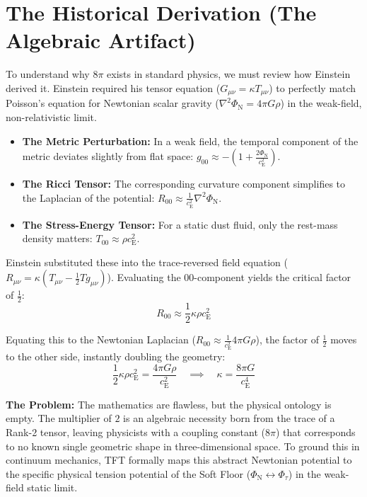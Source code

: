 \section{The Historical Derivation (The Algebraic Artifact)}
To understand why $8\pi$ exists in standard physics, we must review how Einstein derived it. Einstein required his tensor equation ($G_{\mu\nu} = \kappa T_{\mu\nu}$) to perfectly match Poisson's equation for Newtonian scalar gravity ($\nabla^2 \Phi_{\mathrm{N}} = 4\pi G \rho$) in the weak-field, non-relativistic limit.

\begin{itemize}
    \item \textbf{The Metric Perturbation:} In a weak field, the temporal component of the metric deviates slightly from flat space: $g_{00} \approx -\left(1 + \frac{2\Phi_{\mathrm{N}}}{c_{\mathrm{E}}^2}\right)$.
    \item \textbf{The Ricci Tensor:} The corresponding curvature component simplifies to the Laplacian of the potential: $R_{00} \approx \frac{1}{c_{\mathrm{E}}^2} \nabla^2 \Phi_{\mathrm{N}}$.
    \item \textbf{The Stress-Energy Tensor:} For a static dust fluid, only the rest-mass density matters: $T_{00} \approx \rho c_{\mathrm{E}}^2$.
\end{itemize}

Einstein substituted these into the trace-reversed field equation ($R_{\mu\nu} = \kappa \left(T_{\mu\nu} - \frac{1}{2} T g_{\mu\nu}\right)$). Evaluating the $00$-component yields the critical factor of $\frac{1}{2}$:
\begin{equation}
    R_{00} \approx \frac{1}{2} \kappa \rho c_{\mathrm{E}}^2
\end{equation}

Equating this to the Newtonian Laplacian ($R_{00} \approx \frac{1}{c_{\mathrm{E}}^2} 4\pi G \rho$), the factor of $\frac{1}{2}$ moves to the other side, instantly doubling the geometry:
\begin{equation}
    \frac{1}{2} \kappa \rho c_{\mathrm{E}}^2 = \frac{4\pi G \rho}{c_{\mathrm{E}}^2} \quad \implies \quad \kappa = \frac{8\pi G}{c_{\mathrm{E}}^4}
\end{equation}

\noindent\textbf{The Problem:} The mathematics are flawless, but the physical ontology is empty. The multiplier of $2$ is an algebraic necessity born from the trace of a Rank-2 tensor, leaving physicists with a coupling constant ($8\pi$) that corresponds to no known single geometric shape in three-dimensional space. To ground this in continuum mechanics, TFT formally maps this abstract Newtonian potential to the specific physical tension potential of the Soft Floor ($\Phi_{\mathrm{N}} \longleftrightarrow \Phi_\tau$) in the weak-field static limit.

